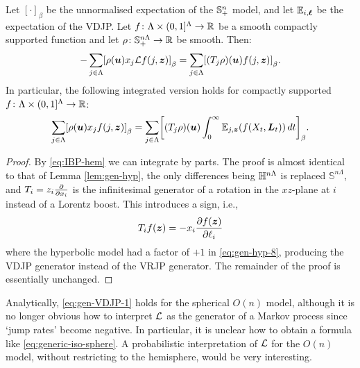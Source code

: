 \documentclass[11pt,a4paper]{article}
\begin{document}
\begin{lemma}
  \label{lem:gen-VDJP}
  Let $[\cdot]_\beta$ be the unnormalised expectation of the
  ${\mathbb S}_+^n$ model, and let $\mathbb{E}_{i,\boldsymbol{\ell}}$ be the expectation of
  the VDJP.  Let $f\colon \Lambda\times (0,1]^{\Lambda} \to \mathbb{R}$ be a
  smooth compactly supported function and let
  $\rho\colon \mathbb{S}^{n\Lambda}_+\to \mathbb{R}$ be smooth.  Then:
  \begin{equation}
    \label{eq:gen-VDJP-1}
    -\sum_{j\in\Lambda}\cb{\rho(\V{u})x_{j}  \cL f(j, \V{z})}_{\beta}
    =
    \sum_{j\in\Lambda} \cb{(T_j\rho)(\V{u})f(j,\V{z})}_{\beta}
    .
  \end{equation}
  In particular, the following integrated version holds for compactly
  supported $f\colon\Lambda\times(0,1]^{\Lambda}\to\mathbb{R}$:
  \begin{equation}
    \label{eq:generic-iso-sphere}
    \sum_{j\in\Lambda}\uspin{\rho(\V{u})x_{j} f(j, \V{z})}_{\beta}
    =
    \sum_{j\in\Lambda} \uspin{(T_j\rho)(\V{u})\int_0^\infty \E_{j,\V{z}}(f(X_t,\V{L}_t))\,dt}_{\beta}
    .
  \end{equation}
\end{lemma}

\begin{proof}
  By \eqref{eq:IBP-hem} we can integrate by parts. The proof is almost
  identical to that of Lemma \ref{lem:gen-hyp}, the only differences
  being $\mathbb{H}^{n\Lambda}$ is replaced $\mathbb{S}^{n\Lambda}$, and
  $T_i = z_i \frac{\partial }{\partial x_i}$ is the infinitesimal generator of a rotation
  in the $xz$-plane at $i$ instead of a Lorentz boost. This introduces
  a sign, i.e.,
  \begin{equation}
  T_if(\boldsymbol{z}) = -x_i \frac{\partial f(\boldsymbol{z})}{\partial \ell_i}
  \end{equation}
  where the hyperbolic model had a factor of $+1$ in
  \eqref{eq:gen-hyp-8}, producing the VDJP generator instead of the
  VRJP generator. The remainder of the proof is essentially unchanged.
\end{proof}

\begin{remark}
  \label{rem:sphericalint}
  Analytically, \eqref{eq:gen-VDJP-1} holds for the spherical
  $O(n)$ model, although it is no longer obvious how to interpret
  $\mathcal L$ as the generator of a Markov process since `jump rates' become
  negative. In particular, it is unclear how to obtain a formula
  like \eqref{eq:generic-iso-sphere}. A probabilistic
  interpretation of $\mathcal L$
  for the $O(n)$ model, without restricting to the hemisphere, would be very
  interesting.
\end{remark}
\end{document}

